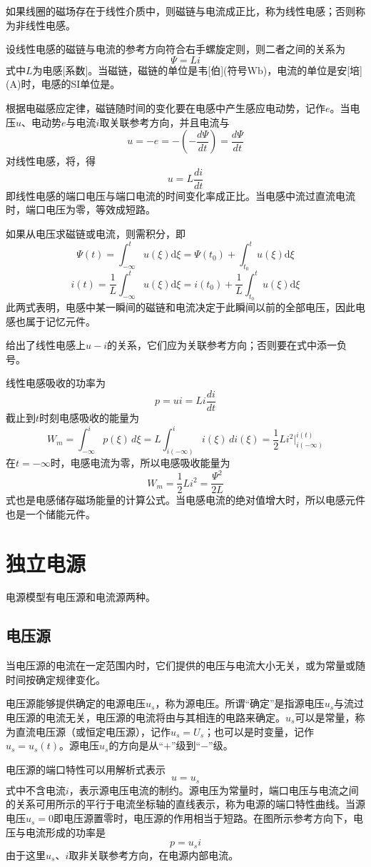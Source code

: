 如果线圈的磁场存在于线性介质中，则磁链与电流成正比，称为线性电感；否则称为非线性电感。

设线性电感的磁链与电流的参考方向符合右手螺旋定则，则二者之间的关系为
\[
\Psi=Li
\]
式中$L$为电感[系数]。当磁链，磁链的单位是韦[伯](符号$\mathrm{Wb}$)，电流的单位是安[培]($\mathrm{A}$)时，电感的SI单位是。

根据电磁感应定律，磁链随时间的变化要在电感中产生感应电动势，记作$e$。当电压$u$、电动势$e$与电流$i$取关联参考方向，并且电流与
\[
u=-e=-\left(-\frac{d\Psi}{dt}\right)=\frac{d\Psi}{dt}
\]
对线性电感，将，得
\[
u=L\frac{di}{dt}
\]
即线性电感的端口电压与端口电流的时间变化率成正比。当电感中流过直流电流时，端口电压为零，等效成短路。

如果从电压求磁链或电流，则需积分，即
\[
\Psi(t)=\int_{-\infty}^t u(\xi)\mathrm{d}\xi
=\Psi(t_0)+\int_{t_0}^t u(\xi)\mathrm{d}\xi
\]
\[
i(t)=\frac{1}{L}\int_{-\infty}^t u(\xi)\mathrm{d}\xi
=i(t_0)+\frac{1}{L}\int_{t_0}^t u(\xi)\mathrm{d}\xi
\]
此两式表明，电感中某一瞬间的磁链和电流决定于此瞬间以前的全部电压，因此电感也属于记忆元件。

给出了线性电感上$u-i$的关系，它们应为关联参考方向；否则要在式中添一负号。

线性电感吸收的功率为
\[
p=ui=Li\frac{di}{dt}
\]
截止到$t$时刻电感吸收的能量为
\[
W_m = \int_{-\infty}^{i} p(\xi) \, d\xi
= L \int_{i(-\infty)}^{i} i(\xi) \, di(\xi)
= \frac{1}{2} L i^2 \bigg|_{i(-\infty)}^{i(t)}
\]
在$t=-\infty$时，电感电流为零，所以电感吸收能量为
\[
W_m=\frac{1}{2}Li^2=\frac{\Psi^2}{2L}
\]
式也是电感储存磁场能量的计算公式。当电感电流的绝对值增大时，所以电感元件也是一个储能元件。

\section{独立电源}
电源模型有电压源和电流源两种。

\subsection{电压源}
当电压源的电流在一定范围内时，它们提供的电压与电流大小无关，或为常量或随时间按确定规律变化。

电压源能够提供确定的电源电压$u_s$，称为源电压。所谓“确定”是指源电压$u_s$与流过电压源的电流无关，电压源的电流将由与其相连的电路来确定。$u_s$可以是常量，称为直流电压源（或恒定电压源），记作$u_s=U_s$；也可以是时变量，记作$u_s=u_s(t)$。源电压$u_s$的方向是从“$+$”级到“$-$”级。

电压源的端口特性可以用解析式表示
\[
u=u_s
\]
式中不含电流$i$，表示源电压电流的制约。源电压为常量时，端口电压与电流之间的关系可用所示的平行于电流坐标轴的直线表示，称为电源的端口特性曲线。当源电压$u_s=0$即电压源置零时，电压源的作用相当于短路。在图所示参考方向下，电压与电流形成的功率是
\[
p=u_si
\]
由于这里$u_s、i$取非关联参考方向，在电源内部电流。

